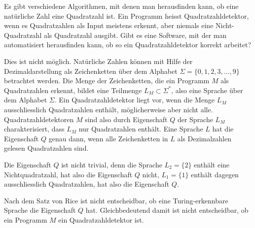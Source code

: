 Es gibt verschiedene Algorithmen, mit denen man herausfinden kann, ob
eine natürliche Zahl eine Quadratzahl ist.
Ein Programm heisst Quadratzahldetektor, wenn es Quadratzahlen
als Input meistens erkennt, aber niemals eine Nicht-Qua\-dratzahl
als Quadratzahl ausgibt. Gibt es eine Software, mit der man automatisiert
herausfinden kann, ob so ein Quadratzahldetektor korrekt arbeitet?


\begin{loesung}
Dies ist nicht möglich. 
Natürliche Zahlen können mit Hilfe der Dezimaldarstellung als 
Zeichenketten über dem Alphabet $\Sigma=\{0,1,2,3,\dots,9\}$
betrachtet werden.
Die Menge der Zeichenketten, die ein Programm $M$ als Quadratzahlen
erkennt, bildet eine Teilmenge $L_M\subset\Sigma^*$, also eine Sprache
über dem Alphabet $\Sigma$. Ein Quadratzahldetektor liegt vor, wenn
die Menge $L_M$ ausschliesslich Quadratzahlen enthält, möglicherweise
aber nicht alle. Quadratzahldetektoren $M$ sind also durch Eigenschaft
$Q$ der Sprache $L_M$ charakterisiert, dass $L_M$ nur Quadratzahlen
enthält. Eine Sprache $L$ hat die Eigenschaft $Q$ genau dann, wenn
alle Zeichenketten in $L$ als Dezimalzahlen gelesen Quadratzahlen sind.

Die Eigenschaft $Q$ ist nicht trivial, denn die Sprache 
$L_2=\{2\}$ enthält eine Nichtquadratzahl, hat also die Eigenschaft $Q$
nicht, $L_1=\{1\}$ enthält dagegen aus\-schliess\-lich Quadratzahlen, hat
also die Eigenschaft $Q$.

Nach dem Satz von Rice ist nicht entscheidbar, ob eine Turing-erkennbare
Sprache die Eigenschaft $Q$ hat. Gleichbedeutend damit ist
nicht entscheidbar, ob ein Programm $M$ ein Quadratzahldetektor ist.
\end{loesung}
